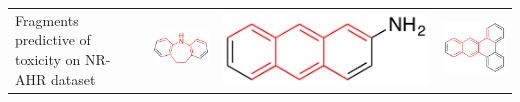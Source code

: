 \documentclass[landscape,a0b,final,a4resizeable]{include/a0poster}
\begin{document}
\begin{poster}
\begin{multicols}{3}
\begin{center}
\begin{tabular}{>{\centering}m{\mywidthb} >{\centering}m{\mywidtha} >{\centering}m{\mywidtha} >{\centering\arraybackslash}m{\mywidtha}}
\midrule
\vspace{0.5in}
Fragments predictive of toxicity on NR-AHR dataset
\vspace{0.5in}
& \includegraphics[width=6.5cm]{figures/jorge-figures/10.png} 
& \includegraphics[width=\mywidtha]{figures/jorge-figures/11.png}
& \includegraphics[width=7cm]{figures/jorge-figures/12.png}\\
\end{tabular}
\end{center}







\end{multicols}
\end{poster}
\end{document}

